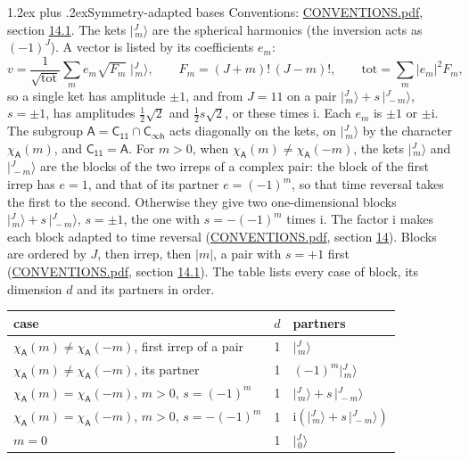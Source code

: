 \documentclass[10pt,a4paper]{article}
\makeatletter
\renewcommand\section{\@startsection{section}{1}{\z@}{-3ex plus -1ex minus -.2ex}%
  {1.2ex plus .2ex}{\normalfont\large\sffamily\bfseries\color{parttitle}}}
\numberwithin{equation}{section}
\newcommand{\grp}[1]{\mathsf{#1}}
\newcommand{\iunit}{\mathrm{i}}
\newcommand{\chiA}{\chi_{\grp{A}}}
\newcommand{\jm}[2]{\bigl\lvert{}^{#1}_{\,#2}\bigr\rangle}
\makeatother
\begin{document}
\section{Symmetry-adapted bases}\label{s:bases}
Conventions: \href{../../CONVENTIONS.pdf}{CONVENTIONS.pdf}, section \href{../../CONVENTIONS.pdf\#conv.14.1}{14.1}.
\leavevmode\label{n:index.m}\label{n:vector.ket}The kets $\jm{J}{m}$ are the spherical harmonics (the inversion acts as $(-1)^J$). \label{n:index.ketcoefficient}\label{n:vector.basis.symmetry}\label{n:index.ketweight}\label{n:index.total}A vector is listed by its coefficients $e_m$:
\begin{equation}\label{e:ket}v = \frac{1}{\sqrt{\mathrm{tot}}}\sum_m e_m\sqrt{F_m}\;\jm{J}{m},\qquad F_m = (J+m)!\,(J-m)!,\qquad \mathrm{tot} = \sum_m |e_m|^2F_m,\end{equation}
\leavevmode\label{n:index.pair.sign}so a single ket has amplitude $\pm1$, and from $J = 11$ on a pair $\jm{J}{m} + s\,\jm{J}{-m}$, $s = \pm1$, has amplitudes $\tfrac{1}{2}\sqrt{2}$ and $\tfrac{1}{2}s\sqrt{2}$, or these times $\iunit$. Each $e_m$ is $\pm1$ or $\pm\iunit$.
\leavevmode\label{n:group.A}\label{n:function.character.abelian}The subgroup $\grp{A} = \grp{C_{11}}\cap\grp{C_{\infty h}}$ acts diagonally on the kets, on $\jm{J}{m}$ by the character $\chiA(m)$, and $\grp{C_{11}} = \grp{A}$. For $m > 0$, when $\chiA(m) \ne \chiA(-m)$, the kets $\jm{J}{m}$ and $\jm{J}{-m}$ are the blocks of the two irreps of a complex pair: the block of the first irrep has $e = 1$, and that of its partner $e = (-1)^m$, so that time reversal takes the first to the second. Otherwise they give two one-dimensional blocks $\jm{J}{m} + s\,\jm{J}{-m}$, $s = \pm1$, the one with $s = -(-1)^m$ times $\iunit$. The factor $\iunit$ makes each block adapted to time reversal (\href{../../CONVENTIONS.pdf}{CONVENTIONS.pdf}, section \href{../../CONVENTIONS.pdf\#conv.14}{14}). Blocks are ordered by $J$, then irrep, then $|m|$, a pair with $s = +1$ first (\href{../../CONVENTIONS.pdf}{CONVENTIONS.pdf}, section \href{../../CONVENTIONS.pdf\#conv.14.1}{14.1}).
\leavevmode\label{n:head.case}\label{n:head.partners}The table lists every case of block, its dimension $d$ and its partners in order.
\begin{center}\begin{tabular}{@{}lrl@{}}\toprule
case & $d$ & partners\\\midrule
$\chiA(m) \ne \chiA(-m)$, first irrep of a pair & 1 & $\jm{J}{m}$\\
$\chiA(m) \ne \chiA(-m)$, its partner & 1 & $(-1)^m\jm{J}{m}$\\
$\chiA(m) = \chiA(-m)$, $m > 0$, $s = (-1)^m$ & 1 & $\jm{J}{m} + s\,\jm{J}{-m}$\\
$\chiA(m) = \chiA(-m)$, $m > 0$, $s = -(-1)^m$ & 1 & $\iunit(\jm{J}{m} + s\,\jm{J}{-m})$\\
$m = 0$ & 1 & $\jm{J}{0}$\\
\bottomrule\end{tabular}\end{center}
\end{document}
